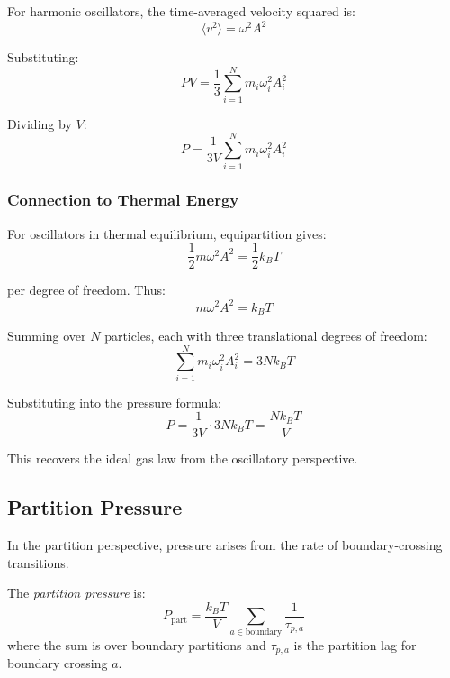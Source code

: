 For harmonic oscillators, the time-averaged velocity squared is:
\begin{equation}
\langle v^2 \rangle = \omega^2 A^2
\end{equation}

Substituting:
\begin{equation}
PV = \frac{1}{3}\sum_{i=1}^{N} m_i \omega_i^2 A_i^2
\end{equation}

Dividing by $V$:
\begin{equation}
P = \frac{1}{3V}\sum_{i=1}^{N} m_i \omega_i^2 A_i^2
\end{equation}

\subsubsection{Connection to Thermal Energy}

For oscillators in thermal equilibrium, equipartition gives:
\begin{equation}
\frac{1}{2}m\omega^2 A^2 = \frac{1}{2}k_B T
\end{equation}

per degree of freedom. Thus:
\begin{equation}
m\omega^2 A^2 = k_B T
\end{equation}

Summing over $N$ particles, each with three translational degrees of freedom:
\begin{equation}
\sum_{i=1}^{N} m_i \omega_i^2 A_i^2 = 3N k_B T
\end{equation}

Substituting into the pressure formula:
\begin{equation}
P = \frac{1}{3V} \cdot 3N k_B T = \frac{N k_B T}{V}
\end{equation}

This recovers the ideal gas law from the oscillatory perspective.

\subsection{Partition Pressure}

In the partition perspective, pressure arises from the rate of boundary-crossing transitions.

\begin{definition}
The \textit{partition pressure} is:
\begin{equation}
\boxed{P_{\text{part}} = \frac{k_B T}{V} \sum_{a \in \text{boundary}} \frac{1}{\tau_{p,a}}}
\label{eq:partition_pressure}
\end{equation}
where the sum is over boundary partitions and $\tau_{p,a}$ is the partition lag for boundary crossing $a$.
\end{definition}

